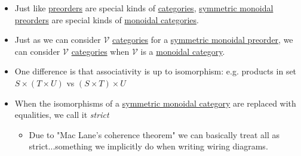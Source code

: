 \begin{itemize}
    \item Just like \href{doc/1 math/Seven Sketches in Compositionality/Chapter 1: Generative Effects/3 Preorders/1 Preorder}{preorders} are special kinds of \href{doc/1 math/Seven Sketches in Compositionality/Chapter 3: Databases/2 Categories/1 Free Categories/1 Category}{categories}, \href{doc/1 math/Seven Sketches in Compositionality/Chapter 2: Resource theories/2 Symmetric monoidal preorders/1 Definition and first examples/1 Symmetric monoidal structure on a preorder}{symmetric monoidal preorders} are special kinds of \href{doc/1 math/Seven Sketches in Compositionality/Chapter 4: Co-design/4 Categorification/3 Monoidal categories/1 SMC}{monoidal categories}.
    \item Just as we can consider $\mathcal{V}$ \href{doc/1 math/Seven Sketches in Compositionality/Chapter 2: Resource theories/3 Enrichment/1 V-categories/1 V-category}{categories} for a \href{doc/1 math/Seven Sketches in Compositionality/Chapter 2: Resource theories/2 Symmetric monoidal preorders/1 Definition and first examples/1 Symmetric monoidal structure on a preorder}{symmetric monoidal preorder}, we can consider $\mathcal{V}$ \href{doc/1 math/Seven Sketches in Compositionality/Chapter 2: Resource theories/3 Enrichment/1 V-categories/1 V-category}{categories} when $\mathcal{V}$ is a \href{doc/1 math/Seven Sketches in Compositionality/Chapter 4: Co-design/4 Categorification/3 Monoidal categories/1 SMC}{monoidal category}.
    \item One difference is that associativity is up to isomorphism: e.g. products in set $S \times (T \times U)$ vs $(S \times T) \times U$
    \item When the isomorphisms of a \href{doc/1 math/Seven Sketches in Compositionality/Chapter 4: Co-design/4 Categorification/3 Monoidal categories/1 SMC}{symmetric monoidal category} are replaced with equalities, we call it \emph{strict}
          \begin{itemize}
            \item Due to "Mac Lane's coherence theorem" we can basically treat all as strict...something we implicitly do when writing wiring diagrams.
          \end{itemize}

  \end{itemize}
